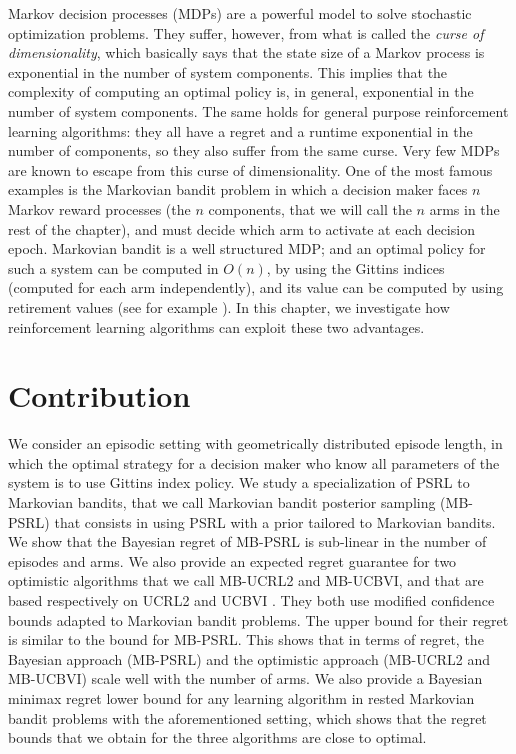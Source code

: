 Markov decision processes (MDPs) are a powerful model to solve stochastic optimization problems. They suffer, however, from what is called the \emph{curse of dimensionality}, which basically says that the state size of a Markov process is exponential in the number of system components. This implies that the complexity of computing an optimal policy is, in general, exponential in the number of system components. The same holds for general purpose reinforcement learning algorithms: they all have a regret and a runtime exponential in the number of components, so they also suffer from the same curse. Very few MDPs are known to escape from this curse of dimensionality. One of the most famous examples is the Markovian bandit problem in which a decision maker faces $n$ Markov reward processes (the $n$ components, that we will call the $n$ arms in the rest of the chapter), and must decide which arm to activate at each decision epoch. Markovian bandit is a well structured MDP; and an optimal policy for such a system can be computed in $O(n)$, by using the Gittins indices (computed for each arm independently), and its value can be computed by using retirement values (see for example \cite{whittle1996optimal}). In this chapter, we investigate how reinforcement learning algorithms can exploit these two advantages.

\section{Contribution}
\label{ch:rested:sec:contribute}

We consider an episodic setting with geometrically distributed episode length, in which the optimal strategy for a decision maker who know all parameters of the system is to use Gittins index policy. We study a specialization of PSRL \cite{osband2013more} to Markovian bandits, that we call Markovian bandit posterior sampling (MB-PSRL) that consists in using PSRL with a prior tailored to Markovian bandits. We show that the Bayesian regret of MB-PSRL is sub-linear in the number of episodes and arms. We also provide an expected regret guarantee for two optimistic algorithms that we call MB-UCRL2 and MB-UCBVI, and that are based respectively on UCRL2 \cite{jaksch2010near} and UCBVI \cite{azar2017minimax}. They both use modified  confidence bounds adapted to Markovian bandit problems. The upper bound for their regret is similar to the bound for MB-PSRL. This shows that in terms of regret, the Bayesian approach (MB-PSRL) and the optimistic approach (MB-UCRL2 and MB-UCBVI) scale well with the number of arms. We also provide a Bayesian minimax regret lower bound for any learning algorithm in rested Markovian bandit problems with the aforementioned setting, which shows that the regret bounds that we obtain for the three algorithms are close to optimal.

